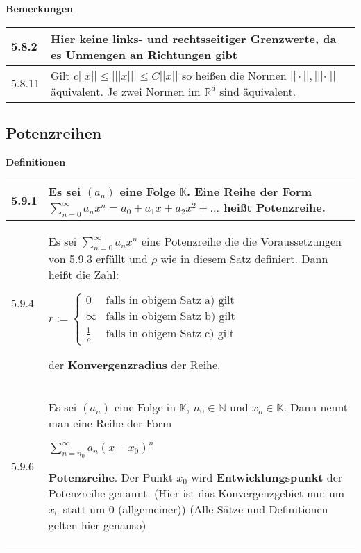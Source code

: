     \noindent
    \textbf{Bemerkungen}
    \begin{table}[H]
    \begin{tabularx}{\textwidth}{X m{16cm}}
        \toprule

        5.8.2 & Hier keine links- und rechtsseitiger Grenzwerte, da es Unmengen an Richtungen gibt \\
        \midrule
        5.8.11& Gilt $c||x|| \leq |||x||| \leq C||x||$ so hei\ss en die Normen $||\cdot||,|||\cdot|||$ äquivalent. \hfill \break
                Je zwei Normen im $\mathbb{R}^d$ sind äquivalent. \\

        \bottomrule
    \end{tabularx}
    \end{table}

    \pagebreak

\subsection{Potenzreihen}
    \noindent
    \textbf{Definitionen}
    \begin{table}[H]  
    \begin{tabularx}{\textwidth}{X m{16cm}}
        \toprule

        5.9.1 & Es sei $(a_n)$ eine Folge $\mathbb{K}$. Eine Reihe der Form $\sum^{\infty}_{n=0} a_n x^n = a_0 + a_1x+a_2x^2+ \dots$ 
                heißt \textbf{Potenzreihe}. \\
        \midrule
        5.9.4 & Es sei $\sum^{\infty}_{n=0} a_nx^n$ eine Potenzreihe die die Voraussetzungen von 5.9.3 erfüllt und $\rho$ wie in diesem Satz 
                definiert. Dann heißt die Zahl: \hfill \break
                \centerline{$r:=    \begin{cases}
                                    0 & \text{falls in obigem Satz a) gilt} \\
                                    \infty & \text{falls in obigem Satz b) gilt} \\
                                    \frac{1}{\rho} & \text{falls in obigem Satz c) gilt}
                                    \end{cases}$ }
                der \textbf{Konvergenzradius} der Reihe. \\
        \midrule
        5.9.6 & Es sei $(a_n)$ eine Folge in $\mathbb{K}$, $n_0 \in \mathbb{N}$ und $x_o \in \mathbb{K}$. Dann nennt man eine Reihe der Form \hfill \break
                \centerline{$\sum^{\infty}_{n=n_0}a_n(x-x_0)^n$}
                \textbf{Potenzreihe}. Der Punkt $x_0$ wird \textbf{Entwicklungspunkt} der Potenzreihe genannt. \hfill \break
                (Hier ist das Konvergenzgebiet nun um $x_0$ statt um 0 (allgemeiner)) \hfill \break
                (Alle Sätze und Definitionen gelten hier genauso) \\

        \bottomrule

    \end{tabularx}
    \end{table}

